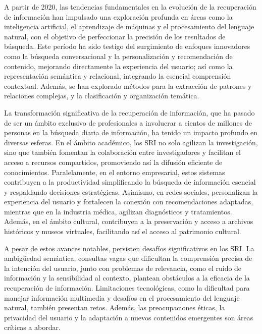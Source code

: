 A partir de 2020, las tendencias fundamentales en la evolución de la recuperación de información han impulsado una exploración profunda en áreas como la inteligencia artificial, el aprendizaje de máquinas y el procesamiento del lenguaje natural, con el objetivo de perfeccionar la precisión de los resultados de búsqueda. Este período ha sido testigo del surgimiento de enfoques innovadores como la búsqueda conversacional y la personalización y recomendación de contenido, mejorando directamente la experiencia del usuario; así como la representación semántica y relacional, integrando la esencial comprensión contextual. Además, se han explorado métodos para la extracción de patrones y relaciones complejas, y la clasificación y organización temática.

La transformación significativa de la recuperaci\'on de informaci\'on, que ha pasado de ser un ámbito exclusivo de profesionales a involucrar a cientos de millones de personas en la búsqueda diaria de información, ha tenido un impacto profundo en diversas esferas. En el ámbito académico, los SRI no solo agilizan la investigación, sino que también fomentan la colaboración entre investigadores y facilitan el acceso a recursos compartidos, promoviendo así la difusión eficiente de conocimientos. Paralelamente, en el entorno empresarial, estos sistemas contribuyen a la productividad simplificando la búsqueda de información esencial y respaldando decisiones estratégicas. Asimismo, en redes sociales, personalizan la experiencia del usuario y fortalecen la conexión con recomendaciones adaptadas, mientras que en la industria médica, agilizan diagnósticos y tratamientos. Además, en el ámbito cultural, contribuyen a la preservación y acceso a archivos históricos y museos virtuales, facilitando así el acceso al patrimonio cultural.

A pesar de estos avances notables, persisten desafíos significativos en los SRI. La ambigüedad semántica, consultas vagas que dificultan la comprensión precisa de la intención del usuario, junto con problemas de relevancia, como el ruido de información y la sensibilidad al contexto, plantean obstáculos a la eficacia de la recuperación de información. Limitaciones tecnológicas, como la dificultad para manejar información multimedia y desafíos en el procesamiento del lenguaje natural, también presentan retos. Además, las preocupaciones éticas, la privacidad del usuario y la adaptación a nuevos contenidos emergentes son áreas críticas a abordar. 

